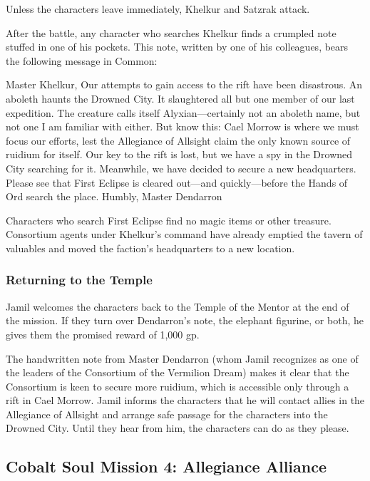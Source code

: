 \documentclass[letterpaper, 11pt, bg=full, twocolumn]{dndbook}
\begin{document}
Unless the characters leave immediately, Khelkur and Satzrak attack.

After the battle, any character who searches Khelkur finds a crumpled note stuffed in one of his pockets. This note, written by one of his colleagues, bears the following message in Common:

\begin{DndReadAloud}
Master Khelkur,
Our attempts to gain access to the rift have been disastrous. An aboleth haunts the Drowned City. It slaughtered all but one member of our last expedition. The creature calls itself Alyxian---certainly not an aboleth name, but not one I am familiar with either. But know this: Cael Morrow is where we must focus our efforts, lest the Allegiance of Allsight claim the only known source of ruidium for itself.
Our key to the rift is lost, but we have a spy in the Drowned City searching for it. Meanwhile, we have decided to secure a new headquarters. Please see that First Eclipse is cleared out---and quickly---before the Hands of Ord search the place.
Humbly, Master Dendarron
\end{DndReadAloud}

Characters who search First Eclipse find no magic items or other treasure. Consortium agents under Khelkur's command have already emptied the tavern of valuables and moved the faction's headquarters to a new location.

\subsubsection{Returning to the Temple}

Jamil welcomes the characters back to the Temple of the Mentor at the end of the mission. If they turn over Dendarron's note, the elephant figurine, or both, he gives them the promised reward of 1,000 gp.

The handwritten note from Master Dendarron (whom Jamil recognizes as one of the leaders of the Consortium of the Vermilion Dream) makes it clear that the Consortium is keen to secure more ruidium, which is accessible only through a rift in Cael Morrow. Jamil informs the characters that he will contact allies in the Allegiance of Allsight and arrange safe passage for the characters into the Drowned City. Until they hear from him, the characters can do as they please.

\subsection{Cobalt Soul Mission 4: Allegiance Alliance}
\end{document}

